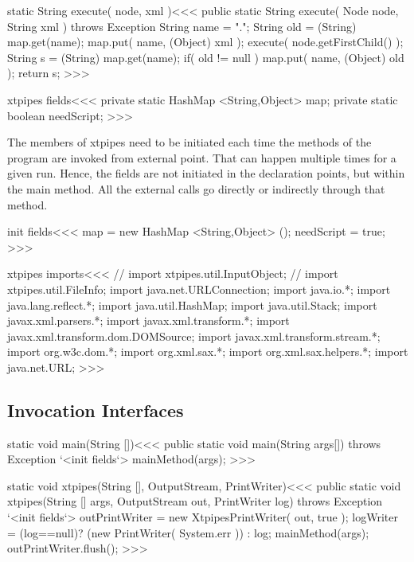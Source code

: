 \documentclass{article}
\begin{document}
{\<static String execute( node, xml )\><<<
public static String execute( Node node, String xml )
                                      throws Exception {
  String name = ".";
  String old = (String) map.get(name);
  map.put( name, (Object) xml );
  execute( node.getFirstChild() );
  String s = (String) map.get(name);
  if( old != null ){ map.put( name, (Object) old ); }
  return s;
}
>>>







\<xtpipes fields\><<<
private static HashMap <String,Object> map;
private static boolean needScript;
>>>


The members of xtpipes need to be initiated each time the methods of
the program are invoked from external point.  That can happen multiple
times for a given run. Hence, the fields are not initiated in the
declaration points, but within the main method.  All the external
calls go directly or indirectly through that method.


\<init fields\><<<
map = new HashMap  <String,Object> ();
needScript = true;
>>>


\<xtpipes imports\><<<
// import xtpipes.util.InputObject;
// import xtpipes.util.FileInfo;
import java.net.URLConnection;
import java.io.*;
import java.lang.reflect.*;
import java.util.HashMap;
import java.util.Stack;
import javax.xml.parsers.*;
import javax.xml.transform.*;
import javax.xml.transform.dom.DOMSource;
import javax.xml.transform.stream.*;
import org.w3c.dom.*;
import org.xml.sax.*;
import org.xml.sax.helpers.*;
import java.net.URL;
>>>

\subsection{Invocation Interfaces}

\<static void main(String [])\><<<
public static void main(String args[]) throws Exception {
  `<init fields`>
  mainMethod(args);
}
>>>




\<static void xtpipes(String [], OutputStream, PrintWriter)\><<<
public static void xtpipes(String [] args,
                           OutputStream out,
                           PrintWriter log)
                                                throws Exception {
  `<init fields`>
  outPrintWriter = new XtpipesPrintWriter( out, true );
  logWriter = (log==null)? (new PrintWriter( System.err )) : log;
  mainMethod(args);
  outPrintWriter.flush();
}
>>>



}
\end{document}
